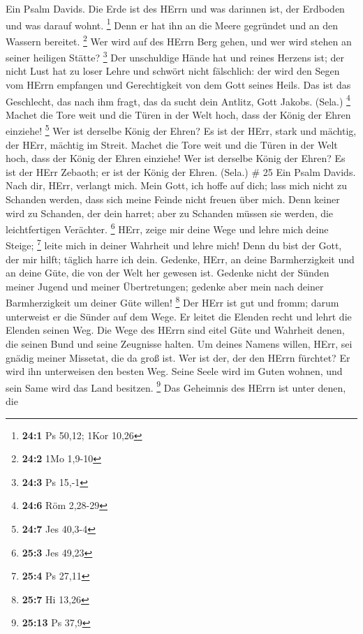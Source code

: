  Ein Psalm Davids. Die Erde ist des HErrn und was darinnen
ist, der Erdboden und was darauf wohnt. \footnote{\textbf{24:1} Ps
  50,12; 1Kor 10,26}  Denn er hat ihn an die Meere gegründet
und an den Wassern bereitet. \footnote{\textbf{24:2} 1Mo 1,9-10}
 Wer wird auf des HErrn Berg gehen, und wer wird stehen an
seiner heiligen Stätte? \footnote{\textbf{24:3} Ps 15,-1} 
Der unschuldige Hände hat und reines Herzens ist; der nicht Lust hat zu
loser Lehre und schwört nicht fälschlich:  der wird den
Segen vom HErrn empfangen und Gerechtigkeit von dem Gott seines Heils.
 Das ist das Geschlecht, das nach ihm fragt, das da sucht
dein Antlitz, Gott Jakobs. (Sela.) \footnote{\textbf{24:6} Röm 2,28-29}
 Machet die Tore weit und die Türen in der Welt hoch, dass
der König der Ehren einziehe! \footnote{\textbf{24:7} Jes 40,3-4}
 Wer ist derselbe König der Ehren? Es ist der HErr, stark
und mächtig, der HErr, mächtig im Streit.  Machet die Tore
weit und die Türen in der Welt hoch, dass der König der Ehren einziehe!
 Wer ist derselbe König der Ehren? Es ist der HErr Zebaoth;
er ist der König der Ehren. (Sela.) \# 25  Ein Psalm Davids.
Nach dir, HErr, verlangt mich.  Mein Gott, ich hoffe auf
dich; lass mich nicht zu Schanden werden, dass sich meine Feinde nicht
freuen über mich.  Denn keiner wird zu Schanden, der dein
harret; aber zu Schanden müssen sie werden, die leichtfertigen
Verächter. \footnote{\textbf{25:3} Jes 49,23}  HErr, zeige
mir deine Wege und lehre mich deine Steige; \footnote{\textbf{25:4} Ps
  27,11}  leite mich in deiner Wahrheit und lehre mich! Denn
du bist der Gott, der mir hilft; täglich harre ich dein. 
Gedenke, HErr, an deine Barmherzigkeit und an deine Güte, die von der
Welt her gewesen ist.  Gedenke nicht der Sünden meiner
Jugend und meiner Übertretungen; gedenke aber mein nach deiner
Barmherzigkeit um deiner Güte willen! \footnote{\textbf{25:7} Hi 13,26}
 Der HErr ist gut und fromm; darum unterweist er die Sünder
auf dem Wege.  Er leitet die Elenden recht und lehrt die
Elenden seinen Weg.  Die Wege des HErrn sind eitel Güte und
Wahrheit denen, die seinen Bund und seine Zeugnisse halten.
 Um deines Namens willen, HErr, sei gnädig meiner Missetat,
die da groß ist.  Wer ist der, der den HErrn fürchtet? Er
wird ihn unterweisen den besten Weg.  Seine Seele wird im
Guten wohnen, und sein Same wird das Land besitzen. \footnote{\textbf{25:13}
  Ps 37,9}  Das Geheimnis des HErrn ist unter denen, die

